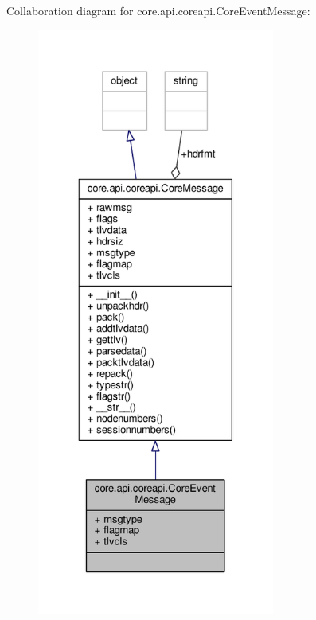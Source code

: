 Collaboration diagram for core.\+api.\+coreapi.\+Core\+Event\+Message\+:
\nopagebreak
\begin{figure}[H]
\begin{center}
\leavevmode
\includegraphics[height=550pt]{classcore_1_1api_1_1coreapi_1_1_core_event_message__coll__graph}
\end{center}
\end{figure}
